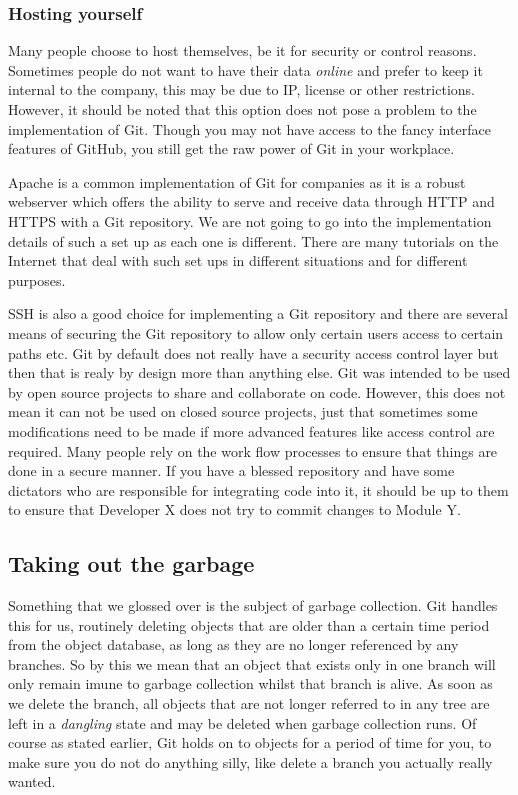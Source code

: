 \subsubsection{Hosting yourself}
Many people choose to host themselves, be it for security or control reasons.
Sometimes people do not want to have their data \emph{online} and prefer to keep it internal to the company, this may be due to IP, license or other restrictions.
However, it should be noted that this option does not pose a problem to the implementation of Git.
Though you may not have access to the fancy interface features of GitHub, you still get the raw power of Git in your workplace.

Apache is a common implementation of Git for companies as it is a robust webserver which offers the ability to serve and receive data through HTTP and HTTPS with a Git repository.
We are not going to go into the implementation details of such a set up as each one is different.
There are many tutorials on the Internet that deal with such set ups in different situations and for different purposes.

SSH is also a good choice for implementing a Git repository and there are several means of securing the Git repository to allow only certain users access to certain paths etc.
Git by default does not really have a security access control layer but then that is realy by design more than anything else.
Git was intended to be used by open source projects to share and collaborate on code.
However, this does not mean it can not be used on closed source projects, just that sometimes some modifications need to be made if more advanced features like access control are required.
Many people rely on the work flow processes to ensure that things are done in a secure manner.
If you have a blessed repository and have some dictators who are responsible for integrating code into it, it should be up to them to ensure that Developer X does not try to commit changes to Module Y.

\subsection{Taking out the garbage}
Something that we glossed over is the subject of garbage collection.
Git handles this for us, routinely deleting objects that are older than a certain time period from the object database, as long as they are no longer referenced by any branches.
So by this we mean that an object that exists only in one branch will only remain imune to garbage collection whilst that branch is alive.
As soon as we delete the branch, all objects that are not longer referred to in any tree are left in a \emph{dangling} state and may be deleted when garbage collection runs.
Of course as stated earlier, Git holds on to objects for a period of time for you, to make sure you do not do anything silly, like delete a branch you actually really wanted.

